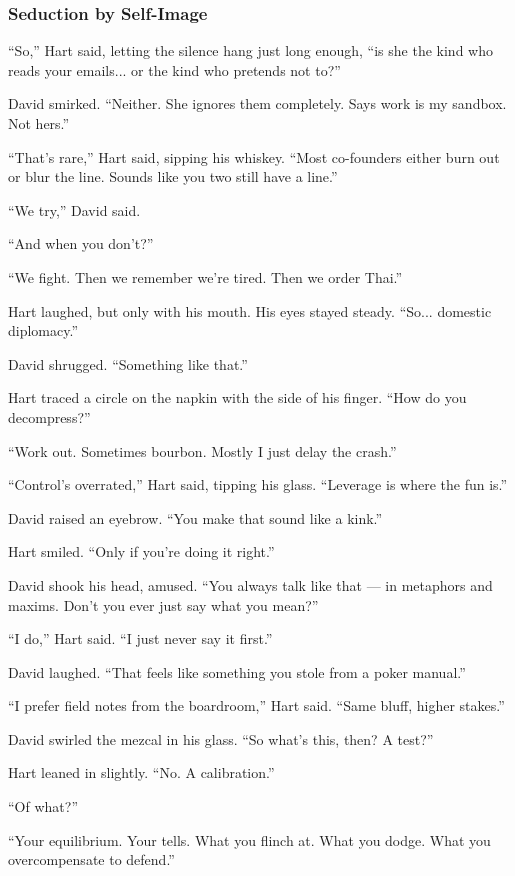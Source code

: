 \medskip


\subsubsection{Seduction by Self-Image}

“So,” Hart said, letting the silence hang just long enough, “is she the kind who reads your 
emails... or the kind who pretends not to?”

David smirked. “Neither. She ignores them completely. Says work is my sandbox. Not hers.”

“That’s rare,” Hart said, sipping his whiskey. “Most co-founders either burn out or blur the 
line. Sounds like you two still have a line.”

“We try,” David said.

“And when you don’t?”

“We fight. Then we remember we’re tired. Then we order Thai.”

Hart laughed, but only with his mouth. His eyes stayed steady. “So... domestic diplomacy.”

David shrugged. “Something like that.”

Hart traced a circle on the napkin with the side of his finger. “How do you decompress?”

“Work out. Sometimes bourbon. Mostly I just delay the crash.”

“Control’s overrated,” Hart said, tipping his glass. “Leverage is where the fun is.”

David raised an eyebrow. “You make that sound like a kink.”

Hart smiled. “Only if you’re doing it right.”

David shook his head, amused. “You always talk like that — in metaphors and maxims. Don’t 
you ever just say what you mean?”

“I do,” Hart said. “I just never say it first.”

David laughed. “That feels like something you stole from a poker manual.”

“I prefer field notes from the boardroom,” Hart said. “Same bluff, higher stakes.”

David swirled the mezcal in his glass. “So what’s this, then? A test?”

Hart leaned in slightly. “No. A calibration.”

“Of what?”

“Your equilibrium. Your tells. What you flinch at. What you dodge. What you overcompensate to defend.”

